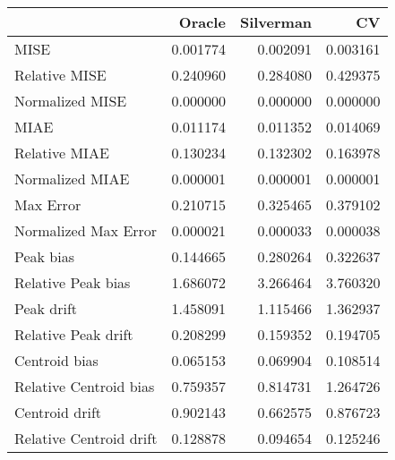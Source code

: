 \begin{tabular}{lrrr}
  \hline
 & Oracle & Silverman & CV \\ 
  \hline
MISE & 0.001774 & 0.002091 & 0.003161 \\ 
  Relative MISE & 0.240960 & 0.284080 & 0.429375 \\ 
  Normalized MISE & 0.000000 & 0.000000 & 0.000000 \\ 
  MIAE & 0.011174 & 0.011352 & 0.014069 \\ 
  Relative MIAE & 0.130234 & 0.132302 & 0.163978 \\ 
  Normalized MIAE & 0.000001 & 0.000001 & 0.000001 \\ 
  Max Error & 0.210715 & 0.325465 & 0.379102 \\ 
  Normalized Max Error & 0.000021 & 0.000033 & 0.000038 \\ 
  Peak bias & 0.144665 & 0.280264 & 0.322637 \\ 
  Relative Peak bias & 1.686072 & 3.266464 & 3.760320 \\ 
  Peak drift & 1.458091 & 1.115466 & 1.362937 \\ 
  Relative Peak drift & 0.208299 & 0.159352 & 0.194705 \\ 
  Centroid bias & 0.065153 & 0.069904 & 0.108514 \\ 
  Relative Centroid bias & 0.759357 & 0.814731 & 1.264726 \\ 
  Centroid drift & 0.902143 & 0.662575 & 0.876723 \\ 
  Relative Centroid drift & 0.128878 & 0.094654 & 0.125246 \\ 
   \hline
\end{tabular}
